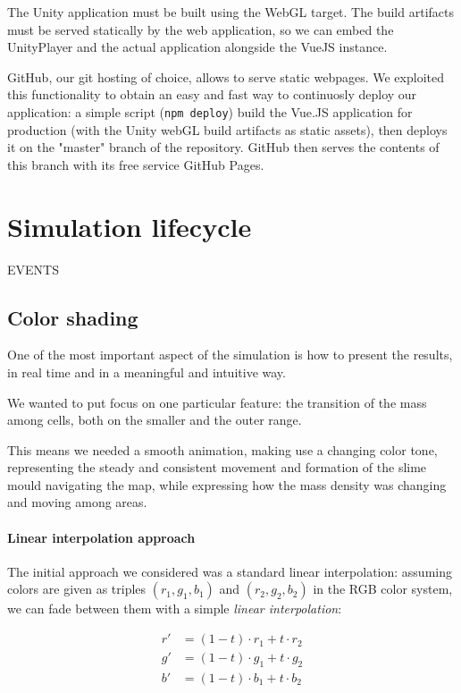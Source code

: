 The Unity application must be built using the WebGL target. The build artifacts must be served statically by the web application, so we can embed the UnityPlayer and the actual application alongside the VueJS instance.

GitHub, our git hosting of choice, allows to serve static webpages. We exploited this functionality to obtain an easy and fast way to continuosly deploy our application: a simple script (\texttt{npm deploy}) build the Vue.JS application for production (with the Unity webGL build artifacts as static assets), then deploys it on the "master" branch of the repository. GitHub then serves the contents of this branch with its free service GitHub Pages.

\section{Simulation lifecycle}


EVENTS 


\subsection{Color shading}

One of the most important aspect of the simulation is how to present the results, in real time and in a meaningful and intuitive way. 

We wanted to put focus on one particular feature: the transition of the mass among cells, both on the smaller and the outer range.

This means we needed a smooth animation, making use a changing color tone, representing the steady and consistent movement and formation of the slime mould navigating the map, while expressing how the mass density was changing and moving among areas.

\paragraph{Linear interpolation approach}

The initial approach we considered was a standard linear interpolation: assuming colors are given as triples $(r_1,g_1,b_1)$ and $(r_2,g_2,b_2)$ in the RGB color system, we can fade between them with a simple \textit{linear interpolation}:

\begin{align}
r' &= (1-t)\cdot r_1+t\cdot r_2\\
g' &= (1-t)\cdot g_1+t\cdot g_2\\
b' &= (1-t)\cdot b_1+t\cdot b_2
\end{align}

